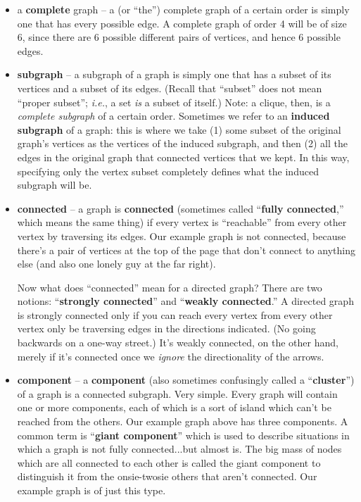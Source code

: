 \documentclass[12pt]{article}
\begin{document}
\begin{itemize}
\item a \textbf{complete} graph -- a (or ``the'') complete graph of a certain
order is simply one that has every possible edge. A complete graph of order 4
will be of size 6, since there are 6 possible different pairs of vertices, and
hence 6 possible edges.

\item \textbf{subgraph} -- a subgraph of a graph is simply one that has a
subset of its vertices and a subset of its edges. (Recall that ``subset'' does
not mean ``proper subset''; \textit{i.e.}, a set \textit{is} a subset of
itself.) Note: a clique, then, is a \textit{complete subgraph} of a certain
order. Sometimes we refer to an \textbf{induced subgraph} of a graph: this is
where we take (1) some subset of the original graph's vertices as the vertices
of the induced subgraph, and then (2) all the edges in the original graph that
connected vertices that we kept. In this way, specifying only the vertex
subset completely defines what the induced subgraph will be.

\item \textbf{connected} -- a graph is \textbf{connected} (sometimes called
``\textbf{fully connected},'' which means the same thing) if every vertex is
``reachable'' from every other vertex by traversing its edges. Our example
graph is not connected, because there's a pair of vertices at the top of the
page that don't connect to anything else (and also one lonely guy at the far
right).

Now what does ``connected'' mean for a directed graph? There are two notions:
``\textbf{strongly connected}'' and ``\textbf{weakly connected}.'' A directed
graph is strongly connected only if you can reach every vertex from every
other vertex only be traversing edges in the directions indicated. (No going
backwards on a one-way street.) It's weakly connected, on the other hand,
merely if it's connected once we \textit{ignore} the directionality of the
arrows.

\item \textbf{component} -- a \textbf{component} (also sometimes confusingly
called a ``\textbf{cluster}'') of a graph is a connected subgraph. Very simple.
Every graph will contain one or more components, each of which is a sort of
island which can't be reached from the others. Our example graph above has
three components. A common term is ``\textbf{giant component}'' which is used
to describe situations in which a graph is not fully connected...but almost
is. The big mass of nodes which are all connected to each other is called the
giant component to distinguish it from the onsie-twosie others that aren't
connected. Our example graph is of just this type.


\end{itemize}
\end{document}
